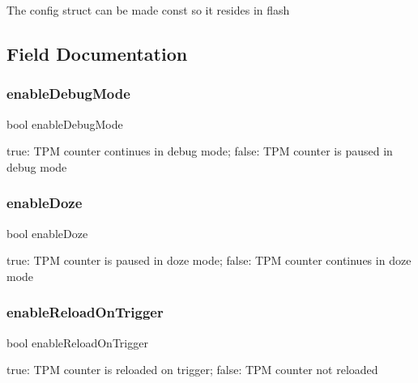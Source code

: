 The config struct can be made const so it resides in flash 

\subsection{Field Documentation}
\mbox{\label{struct__tpm__config_a98bdc9160cf6b06bd551081e3eab65ee}} 
\subsubsection{\texorpdfstring{enableDebugMode}{enableDebugMode}}
{\footnotesize\ttfamily bool enable\+Debug\+Mode}

true\+: T\+PM counter continues in debug mode; false\+: T\+PM counter is paused in debug mode \mbox{\label{struct__tpm__config_adc33c54dc06ce1822fe921591e5b4d8a}} 
\subsubsection{\texorpdfstring{enableDoze}{enableDoze}}
{\footnotesize\ttfamily bool enable\+Doze}

true\+: T\+PM counter is paused in doze mode; false\+: T\+PM counter continues in doze mode \mbox{\label{struct__tpm__config_a7898ff248982be3ba0c9196891db131e}} 
\subsubsection{\texorpdfstring{enableReloadOnTrigger}{enableReloadOnTrigger}}
{\footnotesize\ttfamily bool enable\+Reload\+On\+Trigger}

true\+: T\+PM counter is reloaded on trigger; false\+: T\+PM counter not reloaded \mbox{\label{struct__tpm__config_a6083d820c0646893e6e636a99e5a062f}} 
